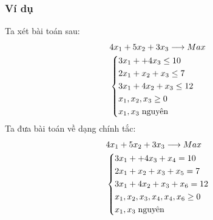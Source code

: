\documentclass[12pt,a4paper]{report}
\begin{document}
 \subsubsection{Ví dụ}
 Ta xét bài toán sau:
 \begin{equation*}
        \begin{split}
         & 4x_1+5x_2+3x_3\longrightarrow Max \\
        & \left\{\begin{split}
            & 3x_1+   +4x_3 \le 10\\
            & 2x_1+x_2+x_3 \le 7\\
            & 3x_1+4x_2+x_3 \le 12\\
            & x_1,x_2,x_3 \ge 0\\
            & x_1,x_3 \hspace{0.1cm}\text{nguyên}\\
        \end{split}\right.
    \end{split}
    \end{equation*}
    Ta đưa bài toán về dạng chính tắc:\\
    \begin{equation*}
        \begin{split}
         &4x_1+5x_2+3x_3 \longrightarrow Max \\
        & \left\{\begin{split}
            & 3x_1+  +4x_3+x_4=10\\
            &2x_1+x_2+x_3+x_5=7\\
            &3x_1+4x_2+x_3+  x_6=12\\
            & x_1,x_2,x_3,x_4,x_4,x_6 \ge 0\\
            & x_1,x_3 \hspace{0.1cm} \text{nguyên}\\
        \end{split}\right.
    \end{split}
    \end{equation*}
\end{document}
